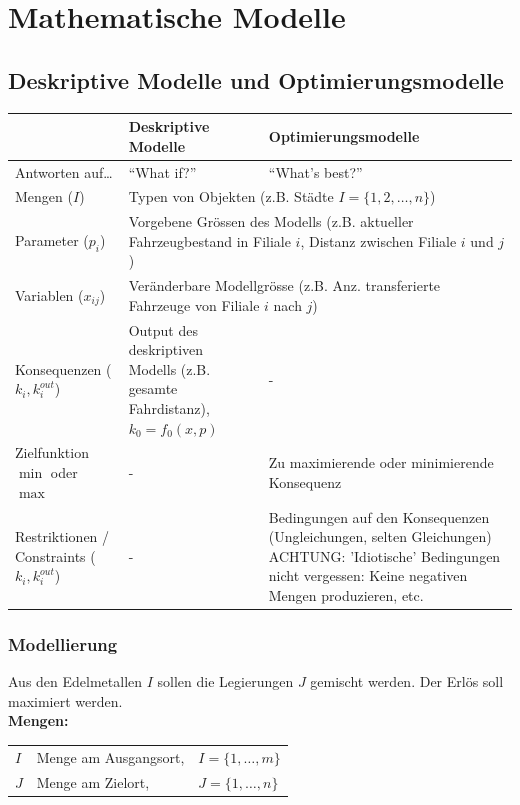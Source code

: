 \section{Mathematische Modelle }
\subsection{Deskriptive Modelle und Optimierungsmodelle }
  \begin{tabular}{|p{3.7cm}|p{7cm}|p{7cm}|}
    \hline
    & \textbf{Deskriptive Modelle}
    & \textbf{Optimierungsmodelle} \\
    \hline
    \hline
    Antworten auf\ldots
      & ``What if?''
      & ``What's best?'' \\
    \hline
    Mengen ($I$)
      & \multicolumn{2}{l|}{Typen von Objekten (z.B. Städte $I = \{1,2,\ldots,n\}$)} \\
    \hline
    Parameter ($p_i$)
      & \multicolumn{2}{p{14cm}|}{Vorgebene Grössen des Modells (z.B. aktueller Fahrzeugbestand in Filiale $i$, Distanz zwischen Filiale $i$ und $j$)} \\
    \hline
    Variablen ($x_{ij}$)
      & \multicolumn{2}{l|}{Veränderbare Modellgrösse (z.B. Anz. transferierte Fahrzeuge von Filiale $i$ nach $j$)} \\
    \hline
    Konsequenzen ($k_{i}, k_i^{out}$)
      & Output des deskriptiven Modells (z.B. gesamte Fahrdistanz), $k_0 = f_0(x,p)$ 
      & -\\
    \hline
    Zielfunktion $\min$ oder $\max$
      & - 
      & Zu maximierende oder minimierende Konsequenz\\
    \hline
    Restriktionen / Constraints ($k_{i}, k_i^{out}$)
      & - 
      & Bedingungen auf den Konsequenzen (Ungleichungen, selten Gleichungen) ACHTUNG: 'Idiotische' Bedingungen nicht vergessen: Keine negativen Mengen produzieren, etc.\\
    \hline
  \end{tabular}
  
  \subsubsection{Modellierung}
  Aus den Edelmetallen $I$ sollen die Legierungen $J$ gemischt werden. Der Erlös soll maximiert werden.\\
  
  \textbf{Mengen:}\\
  \begin{tabular}{lll}
    $I$ & Menge am Ausgangsort, &$I = \{1, \ldots, m\}$\\
    $J$ & Menge am Zielort, &$J = \{1, \ldots, n\}$
  \end{tabular}\\
  
